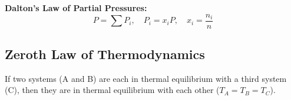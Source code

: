 \textbf{Dalton's Law of Partial Pressures:}
\begin{equation}
    P = \sum P_i, \quad P_i = x_i P, \quad x_i = \frac{n_i}{n}
\end{equation}

\subsection{Zeroth Law of Thermodynamics}
If two systems (A and B) are each in thermal equilibrium with a third system (C), then they are in thermal equilibrium with each other ($T_A = T_B = T_C$).
